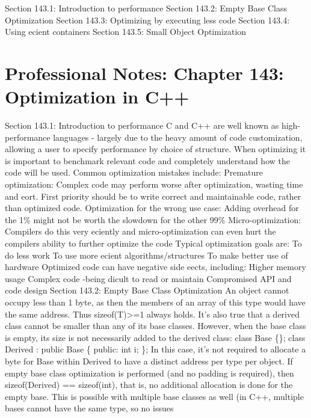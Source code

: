Section 143.1: Introduction to performance Section 143.2: Empty Base
Class Optimization Section 143.3: Optimizing by executing less code
Section 143.4: Using ecient containers Section 143.5: Small Object
Optimization

\hypertarget{professional-notes-chapter-143-optimization-in-c-1}{%
\chapter{Professional Notes: Chapter 143: Optimization in
C++}\label{professional-notes-chapter-143-optimization-in-c-1}}

Section 143.1: Introduction to performance C and C++ are well known as
high-performance languages - largely due to the heavy amount of code
customization, allowing a user to specify performance by choice of
structure. When optimizing it is important to benchmark relevant code
and completely understand how the code will be used. Common optimization
mistakes include: Premature optimization: Complex code may perform worse
after optimization, wasting time and eort. First priority should be to
write correct and maintainable code, rather than optimized code.
Optimization for the wrong use case: Adding overhead for the 1\% might
not be worth the slowdown for the other 99\% Micro-optimization:
Compilers do this very eciently and micro-optimization can even hurt the
compilers ability to further optimize the code Typical optimization
goals are: To do less work To use more ecient algorithms/structures To
make better use of hardware Optimized code can have negative side eects,
including: Higher memory usage Complex code -being dicult to read or
maintain Compromised API and code design Section 143.2: Empty Base Class
Optimization An object cannot occupy less than 1 byte, as then the
members of an array of this type would have the same address. Thus
sizeof(T)\textgreater=1 always holds. It's also true that a derived
class cannot be smaller than any of its base classes. However, when the
base class is empty, its size is not necessarily added to the derived
class: class Base \{\}; class Derived : public Base \{ public: int i;
\}; In this case, it's not required to allocate a byte for Base within
Derived to have a distinct address per type per object. If empty base
class optimization is performed (and no padding is required), then
sizeof(Derived) == sizeof(int), that is, no additional allocation is
done for the empty base. This is possible with multiple base classes as
well (in C++, multiple bases cannot have the same type, so no issues
